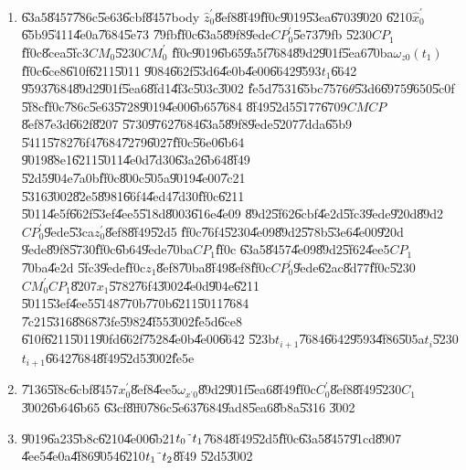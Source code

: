 \documentclass{article}
\begin{document}
\begin{enumerate}
\item \U{63a5}\U{8457}\U{786c}\U{5e63}\U{6cbf}\U{8457}body $\hat{z}%
_{0}^{\prime }$\U{8ef8}\U{8f49}\U{ff0c}\U{9019}\U{53ea}\U{6703}\U{9020}%
\U{6210}$\hat{x}_{0}^{\prime }$\U{65b9}\U{5411}\U{4e0a}\U{7684}\U{5e73}%
\U{79fb}\U{ff0c}\U{63a5}\U{89f8}\U{9ede}$CP_{0}^{\prime }$\U{5e73}\U{79fb}%
\U{5230}$CP_{1}$\U{ff0c}\U{8cea}\U{5fc3}$CM_{0}$\U{5230}$CM_{0}^{\prime }$%
\U{ff0c}\U{9019}\U{6b65}\U{9a5f}\U{7684}\U{89d2}\U{901f}\U{5ea6}\U{70ba}$%
\omega _{z0}\left( t_{1}\right) $\U{ff0c}\U{6ce8}\U{610f}\U{6211}\U{5011}%
\U{9084}\U{662f}\U{53d6}\U{4e0b}\U{4e00}\U{6642}\U{9593}$t_{1}$\U{6642}%
\U{9593}\U{7684}\U{89d2}\U{901f}\U{5ea6}\U{8fd1}\U{4f3c}\U{503c}\U{3002}%
\U{fe5d}\U{7531}\U{65bc}\U{7576}$\theta $\U{53d6}\U{6975}\U{9650}\U{5c0f}%
\U{5f8c}\U{ff0c}\U{786c}\U{5e63}\U{5728}\U{9019}\U{4e00}\U{6b65}\U{7684}%
\U{8f49}\U{52d5}\U{5177}\U{6709}$CMCP$\U{8ef8}\U{7e3d}\U{662f}\U{8207}%
\U{5730}\U{9762}\U{7684}\U{63a5}\U{89f8}\U{9ede}\U{5207}\U{7dda}\U{65b9}%
\U{5411}\U{5782}\U{76f4}\U{7684}\U{7279}\U{6027}\U{ff0c}\U{56e0}\U{6b64}%
\U{9019}\U{88e1}\U{6211}\U{5011}\U{4e0d}\U{7d30}\U{63a2}\U{6b64}\U{8f49}%
\U{52d5}\U{904e}\U{7a0b}\U{ff0c}\U{800c}\U{505a}\U{9019}\U{4e00}\U{7c21}%
\U{5316}\U{3002}\U{82e5}\U{8981}\U{66f4}\U{4ed4}\U{7d30}\U{ff0c}\U{6211}%
\U{5011}\U{4e5f}\U{662f}\U{53ef}\U{4ee5}\U{518d}\U{8003}\U{616e}\U{4e09}%
\U{89d2}\U{5f62}\U{6cbf}\U{4e2d}\U{5fc3}\U{9ede}\U{920d}\U{89d2}$%
CP_{0}^{\prime }$\U{9ede}\U{53ca}$z_{0}^{\prime }$\U{8ef8}\U{8f49}\U{52d5}%
\U{ff0c}\U{76f4}\U{5230}\U{4e09}\U{89d2}\U{578b}\U{53e6}\U{4e00}\U{920d}%
\U{9ede}\U{89f8}\U{5730}\U{ff0c}\U{6b64}\U{9ede}\U{70ba}$CP_{1}$\U{ff0c}%
\U{63a5}\U{8457}\U{4e09}\U{89d2}\U{5f62}\U{4ee5}$CP_{1}$\U{70ba}\U{4e2d}%
\U{5fc3}\U{9ede}\U{ff0c}$z_{1}$\U{8ef8}\U{70ba}\U{8f49}\U{8ef8}\U{ff0c}$%
CP_{0}^{\prime }$\U{9ede}\U{62ac}\U{8d77}\U{ff0c}\U{5230}$CM_{0}^{\prime
}CP_{1}$\U{8207}$x_{1}$\U{5782}\U{76f4}\U{3002}\U{4e0d}\U{904e}\U{6211}%
\U{5011}\U{53ef}\U{4ee5}\U{5148}\U{770b}\U{770b}\U{6211}\U{5011}\U{7684}%
\U{7c21}\U{5316}\U{8868}\U{73fe}\U{5982}\U{4f55}\U{3002}\U{fe5d}\U{6ce8}%
\U{610f}\U{6211}\U{5011}\U{90fd}\U{662f}\U{7528}\U{4e0b}\U{4e00}\U{6642}%
\U{523b}$t_{i+1}$\U{7684}\U{6642}\U{9593}\U{4f86}\U{505a}$t_{i}$\U{5230}$%
t_{i+1}$\U{6642}\U{7684}\U{8f49}\U{52d5}\U{3002}\U{fe5e}

\item \U{7136}\U{5f8c}\U{6cbf}\U{8457}$x_{0}^{\prime }$\U{8ef8}\U{4ee5}$%
\omega _{x^{\prime }0}$\U{89d2}\U{901f}\U{5ea6}\U{8f49}\U{ff0c}$%
C_{0}^{\prime }$\U{8ef8}\U{8f49}\U{5230}$C_{1}$\U{3002}\U{6b64}\U{6b65}%
\U{63cf}\U{8ff0}\U{786c}\U{5e63}\U{7684}\U{9ad8}\U{5ea6}\U{8b8a}\U{5316}%
\U{3002}

\item \U{9019}\U{6a23}\U{5b8c}\U{6210}\U{4e00}\U{6b21}$t_{0}\symbol{126}%
t_{1} $\U{7684}\U{8f49}\U{52d5}\U{ff0c}\U{63a5}\U{8457}\U{91cd}\U{8907}%
\U{4ee5}\U{4e0a}\U{4f86}\U{9054}\U{6210}$t_{1}\symbol{126}t_{2}$\U{8f49}%
\U{52d5}\U{3002}
\end{enumerate}
\end{document}
